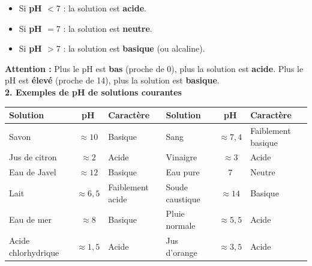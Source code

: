 \documentclass[11pt,a4paper]{article}
\begin{document}
\begin{tcolorbox}[colback=red!5!white,colframe=red!75!black]
{
\begin{center}
\end{center}

\begin{itemize}
    \item Si \textbf{pH $< 7$} : la solution est \textbf{acide}.
    \item Si \textbf{pH $= 7$} : la solution est \textbf{neutre}.
    \item Si \textbf{pH $> 7$} : la solution est \textbf{basique} (ou alcaline).
\end{itemize}
}
\end{tcolorbox}


\textbf{Attention : } Plus le pH est \textbf{bas} (proche de 0), plus la solution est \textbf{acide}. Plus le pH est \textbf{élevé} (proche de 14), plus la solution est \textbf{basique}. \\

\textbf{2. Exemples de pH de solutions courantes} \\

\begin{center}
\begin{tabular}{|l|c|l||l|c|l|}
\hline
\textbf{Solution} & \textbf{pH} & \textbf{Caractère} & \textbf{Solution} & \textbf{pH} & \textbf{Caractère} \\
\hline
Savon & $\approx 10$ & Basique & Sang & $\approx 7{,}4$ & Faiblement basique \\
\hline
Jus de citron & $\approx 2$ & Acide & Vinaigre & $\approx 3$ & Acide \\
\hline
Eau de Javel & $\approx 12$ & Basique & Eau pure & $7$ & Neutre \\
\hline
Lait & $\approx 6{,}5$ & Faiblement acide & Soude caustique & $\approx 14$ & Basique \\
\hline
Eau de mer & $\approx 8$ & Basique & Pluie normale & $\approx 5{,}5$ & Acide \\
\hline
Acide chlorhydrique & $\approx 1{,}5$ & Acide & Jus d'orange & $\approx 3{,}5$ & Acide \\
\hline
\end{tabular}
\end{center}
\end{document}
